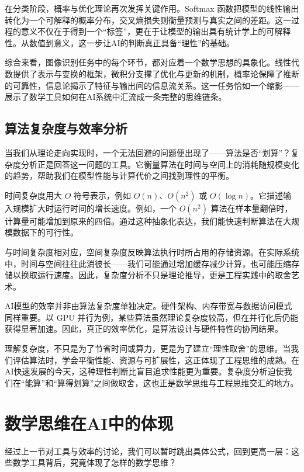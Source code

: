 在分类阶段，概率与优化理论再次发挥关键作用。Softmax 函数把模型的线性输出转化为一个可解释的概率分布，交叉熵损失则衡量预测与真实之间的差距。这一过程的意义不仅在于得到一个“标签”，更在于让模型的输出具有统计学上的可解释性。从数值到意义，这一步让AI的判断真正具备“理性”的基础。

综合来看，图像识别任务中的每个环节，都对应着一个数学思想的具象化。线性代数提供了表示与变换的框架，微积分支撑了优化与更新的机制，概率论保障了推断的可靠性，信息论揭示了特征与输出间的信息流关系。这一任务恰如一个缩影——展示了数学工具如何在AI系统中汇流成一条完整的思维链条。

\subsection{算法复杂度与效率分析}

当我们从理论走向实现时，一个无法回避的问题便出现了——算法是否“划算”？复杂度分析正是回答这一问题的工具。它衡量算法在时间与空间上的消耗随规模变化的趋势，帮助我们在模型性能与计算代价之间找到理性的平衡。

时间复杂度用大 $O$ 符号表示，例如 $O(n)$、$O(n^2)$ 或 $O(\log n)$。它描述输入规模扩大时运行时间的增长速度。例如，一个 $O(n^2)$ 算法在样本量翻倍时，计算量可能增加到原来的四倍。通过这种抽象化表达，我们能快速判断算法在大规模数据下的可行性。

与时间复杂度相对应，空间复杂度反映算法执行时所占用的存储资源。在实际系统中，时间与空间往往此消彼长——我们可能通过增加缓存减少计算，也可能压缩存储以换取运行速度。因此，复杂度分析不只是理论推导，更是工程实践中的取舍艺术。

AI模型的效率并非由算法复杂度单独决定。硬件架构、内存带宽与数据访问模式同样重要。以 GPU 并行为例，某些算法虽然理论复杂度较高，但在并行化后仍能获得显著加速。因此，真正的效率优化，是算法设计与硬件特性的协同结果。

理解复杂度，不只是为了节省时间或算力，更是为了建立“理性取舍”的思维。当我们评估算法时，学会平衡性能、资源与可扩展性，这正体现了工程思维的成熟。在AI快速发展的今天，这种理性判断比盲目追求性能更为重要。复杂度分析迫使我们在“能算”和“算得划算”之间做取舍，这也正是数学思维与工程思维交汇的地方。

\section{数学思维在AI中的体现}

经过上一节对工具与效率的讨论，我们可以暂时跳出具体公式，回到更高一层：这些数学工具背后，究竟体现了怎样的数学思维？

